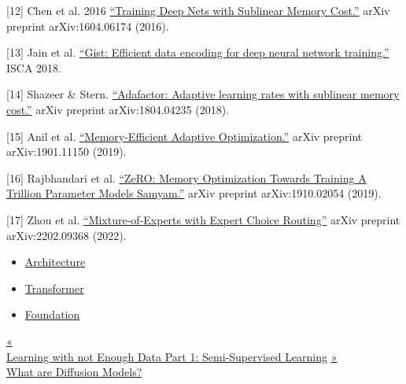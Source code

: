 {[}12{]} Chen et al. 2016 \href{https://arxiv.org/abs/1604.06174}{``Training Deep Nets with Sublinear Memory Cost.''} arXiv preprint arXiv:1604.06174 (2016).

{[}13{]} Jain et al. \href{https://www.microsoft.com/en-us/research/uploads/prod/2018/04/fiddle-gist-isca18.pdf}{``Gist: Efficient data encoding for deep neural network training.''} ISCA 2018.

{[}14{]} Shazeer \& Stern. \href{https://arxiv.org/abs/1804.04235}{``Adafactor: Adaptive learning rates with sublinear memory cost.''} arXiv preprint arXiv:1804.04235 (2018).

{[}15{]} Anil et al. \href{https://arxiv.org/abs/1901.11150}{``Memory-Efficient Adaptive Optimization.''} arXiv preprint arXiv:1901.11150 (2019).

{[}16{]} Rajbhandari et al. \href{https://arxiv.org/abs/1910.02054}{``ZeRO: Memory Optimization Towards Training A Trillion Parameter Models Samyam.''} arXiv preprint arXiv:1910.02054 (2019).

{[}17{]} Zhou et al. \href{https://arxiv.org/abs/2202.09368}{``Mixture-of-Experts with Expert Choice Routing''} arXiv preprint arXiv:2202.09368 (2022).

\begin{itemize}
\tightlist
\item
  \href{https://lilianweng.github.io/tags/architecture/}{Architecture}
\item
  \href{https://lilianweng.github.io/tags/transformer/}{Transformer}
\item
  \href{https://lilianweng.github.io/tags/foundation/}{Foundation}
\end{itemize}

\href{https://lilianweng.github.io/posts/2021-12-05-semi-supervised/}{{« }\\
{Learning with not Enough Data Part 1: Semi-Supervised Learning}} \href{https://lilianweng.github.io/posts/2021-07-11-diffusion-models/}{{ »}\\
{What are Diffusion Models?}}


